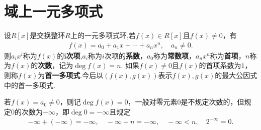 \documentclass[../../main.tex]{subfiles}%
\begin{document}
\section{域上一元多项式}

\begin{definition}
设$R[x]$是交换整环$R$上的一元多项式环,若$f(x)\in R[x]$且$f(x) \neq 0$，有
\begin{align*}
f(x) = a_0 + a_1x + \cdots + a_nx^n,\quad a_n \neq 0.
\end{align*}
则$a_ix^i$称为$f(x)$的$\boldsymbol{i}$\textbf{次项},$a_i$称为$i$次项的\textbf{系数}，$a_0$称为\textbf{常数项}，$a_nx^n$称为\textbf{首项}，$n$称为$f(x)$的\textbf{次数}，记为$\deg f(x) = n$. 如果$f(x) \neq 0$且$f(x)$的首项系数为$1$，则称$f(x)$为\textbf{首一多项式}.今后以$(f(x),g(x))$表示$f(x),g(x)$的最大公因式中的首一多项式.

若$f(x) = a_0 \neq 0$，则记$\deg f(x) = 0$，一般对零元素$0$是不规定次数的，但规定$0$的次数为$-\infty$，即$\deg 0 = -\infty$且规定
\begin{align*}
-\infty + (-\infty) = -\infty,\quad -\infty + n = -\infty,\quad -\infty < n,\quad 2^{-\infty} = 0.
\end{align*}
\end{definition}
\end{document}
